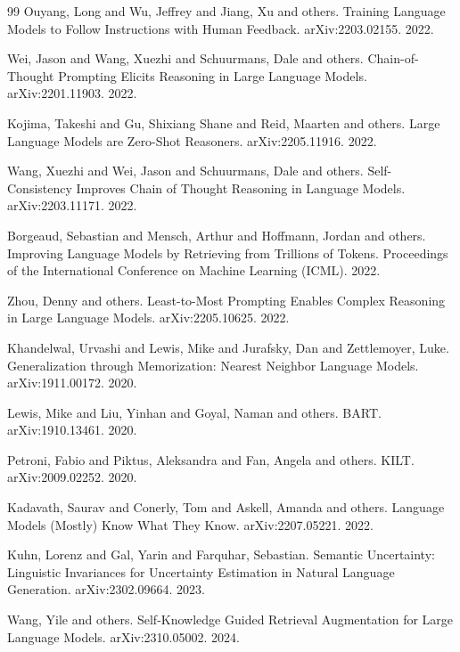 \begin{thebibliography}{99}
Ouyang, Long and Wu, Jeffrey and Jiang, Xu and others. Training Language Models to Follow Instructions with Human Feedback. arXiv:2203.02155. 2022.

Wei, Jason and Wang, Xuezhi and Schuurmans, Dale and others. Chain-of-Thought Prompting Elicits Reasoning in Large Language Models. arXiv:2201.11903. 2022.

Kojima, Takeshi and Gu, Shixiang Shane and Reid, Maarten and others. Large Language Models are Zero-Shot Reasoners. arXiv:2205.11916. 2022.

Wang, Xuezhi and Wei, Jason and Schuurmans, Dale and others. Self-Consistency Improves Chain of Thought Reasoning in Language Models. arXiv:2203.11171. 2022.

Borgeaud, Sebastian and Mensch, Arthur and Hoffmann, Jordan and others. Improving Language Models by Retrieving from Trillions of Tokens. Proceedings of the International Conference on Machine Learning (ICML). 2022.

Zhou, Denny and others. Least-to-Most Prompting Enables Complex Reasoning in Large Language Models. arXiv:2205.10625. 2022.

Khandelwal, Urvashi and Lewis, Mike and Jurafsky, Dan and Zettlemoyer, Luke. Generalization through Memorization: Nearest Neighbor Language Models. arXiv:1911.00172. 2020.

Lewis, Mike and Liu, Yinhan and Goyal, Naman and others. BART. arXiv:1910.13461. 2020.

Petroni, Fabio and Piktus, Aleksandra and Fan, Angela and others. KILT. arXiv:2009.02252. 2020.

Kadavath, Saurav and Conerly, Tom and Askell, Amanda and others. Language Models (Mostly) Know What They Know. arXiv:2207.05221. 2022.

Kuhn, Lorenz and Gal, Yarin and Farquhar, Sebastian. Semantic Uncertainty: Linguistic Invariances for Uncertainty Estimation in Natural Language Generation. arXiv:2302.09664. 2023.

Wang, Yile and others. Self-Knowledge Guided Retrieval Augmentation for Large Language Models. arXiv:2310.05002. 2024.

\end{thebibliography}


